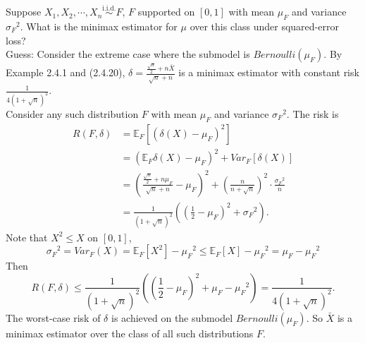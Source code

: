 \documentclass[a4paper]{article}
\begin{document}
\begin{eg}
	Suppose  $X_1, X_2, \cdots, X_n \stackrel{\text{i.i.d.}}{\sim} F$, $F$ supported on $[0,1]$ with mean $\mu_F$ and variance ${\sigma_F}^2$. What is the minimax estimator for $\mu$ over this class under squared-error loss? \\
	\newline
	Guess: Consider the extreme case where the submodel is $Bernoulli(\mu_F)$. By Example 2.4.1 and (2.4.20), $\delta = \frac{\frac{\sqrt{n}}{2} + n \bar{X}}{\sqrt{n} + n}$ is a minimax estimator with constant risk $\frac{1}{4(1+\sqrt{n})^2}$. \\
	Consider any such distribution $F$ with mean $\mu_F$ and variance ${\sigma_F}^2$. The risk is
	\begin{equation}
		\begin{aligned}
			R(F,\delta) &= \mathbb{E}_F[(\delta(X)-\mu_F)^2] \\
			&= (\mathbb{E}_F\delta(X)-\mu_F)^2 + Var_F[\delta(X)] \\
			&= \left(\frac{\frac{\sqrt{n}}{2} + n\mu_F}{\sqrt{n} + n} - \mu_F\right)^2 + \left(\frac{n}{n+\sqrt{n}}\right)^2 \cdot \frac{{\sigma_F}^2}{n} \\
			&= \frac{1}{(1+\sqrt{n})^2}\left(\left(\frac{1}{2} - \mu_F\right)^2 + {\sigma_F}^2\right).
		\end{aligned}
	\end{equation}
	Note that $X^2 \leq X$ on $[0,1]$,
	\begin{equation*}
		{\sigma_F}^2 = Var_F(X) = \mathbb{E}_F[X^2] - {\mu_F}^2 \leq \mathbb{E}_F[X] - {\mu_F}^2 = \mu_F - {\mu_F}^2
	\end{equation*}
	Then
	\begin{equation}
		R(F,\delta) \leq \frac{1}{(1+\sqrt{n})^2}\left(\left(\frac{1}{2} - \mu_F\right)^2 + \mu_F - {\mu_F}^2\right) = \frac{1}{4(1+\sqrt{n})^2}.
	\end{equation}
	The worst-case risk of $\delta$ is achieved on the submodel $Bernoulli(\mu_F)$. So $\bar{X}$ is a minimax estimator over the class of all such distributions $F$.
\end{eg}
\end{document}
